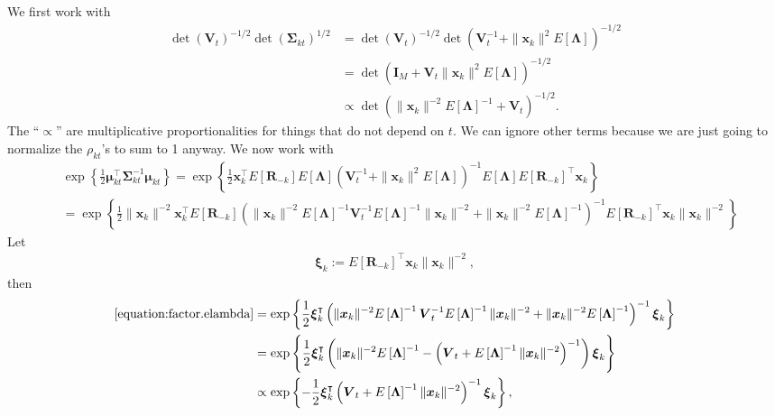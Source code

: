 \documentclass[11pt,authoryear]{article}
\newcommand{\bs}[1]{\boldsymbol{#1}}
\begin{document}
We first work with
\begin{align}
\det(\bs{V}_t)^{-1/2}\det(\bs{\Sigma}_{kt})^{1/2} &= \det(\bs{V}_t)^{-1/2}\det\left(\bs{V}_t^{-1} + \|\bs{x}_k\|^2E\left[\bs{\Lambda}\right]\right)^{-1/2}\\
&= \det\left(\bs{I}_M + \bs{V}_t\|\bs{x}_k\|^2E\left[\bs{\Lambda}\right]\right)^{-1/2}\\
\label{equation:y.marge.det}&\propto \det\left(\|\bs{x}_k\|^{-2}E\left[\bs{\Lambda}\right]^{-1} + \bs{V}_t\right)^{-1/2}.
\end{align}
The ``$\propto$'' are multiplicative proportionalities for things that
do not depend on $t$. We can ignore other terms because we are just
going to normalize the $\rho_{kt}$'s to sum to 1 anyway. We now work with
\begin{align}
&\exp\left\{\frac{1}{2}\bs{\mu}_{kt}^{\intercal}\bs{\Sigma}_{kt}^{-1}\bs{\mu}_{kt}\right\} = \exp\left\{\frac{1}{2}\bs{x}_k^{\intercal}E\left[\bs{R}_{-k}\right]E\left[\bs{\Lambda}\right]\left(\bs{V}_t^{-1} + \|\bs{x}_k\|^2E\left[\bs{\Lambda}\right]\right)^{-1}E\left[\bs{\Lambda}\right]E\left[\bs{R}_{-k}\right]^{\intercal}\bs{x}_k\right\}\\
\label{equation:factor.elambda}&=\exp\left\{\frac{1}{2}\|\bs{x}_k\|^{-2}\bs{x}_k^{\intercal}E\left[\bs{R}_{-k}\right]\left(\|\bs{x}_k\|^{-2}E\left[\bs{\Lambda}\right]^{-1}\bs{V}_t^{-1}E\left[\bs{\Lambda}\right]^{-1}\|\bs{x}_k\|^{-2} + \|\bs{x}_k\|^{-2}E\left[\bs{\Lambda}\right]^{-1}\right)^{-1}E\left[\bs{R}_{-k}\right]^{\intercal}\bs{x}_k\|\bs{x}_k\|^{-2}\right\}
\end{align}
Let
\begin{align}
\bs{\xi}_k := E\left[\bs{R}_{-k}\right]^{\intercal}\bs{x}_k\|\bs{x}_k\|^{-2},
\end{align}
then
\begin{align}
\eqref{equation:factor.elambda} &= \exp\left\{\frac{1}{2}\bs{\xi}_k^{\intercal}\left(\|\bs{x}_k\|^{-2}E\left[\bs{\Lambda}\right]^{-1}\bs{V}_t^{-1}E\left[\bs{\Lambda}\right]^{-1}\|\bs{x}_k\|^{-2} + \|\bs{x}_k\|^{-2}E\left[\bs{\Lambda}\right]^{-1}\right)^{-1}\bs{\xi}_k\right\}\\
\label{equation:woodbury}&= \exp\left\{\frac{1}{2}\bs{\xi}_k^{\intercal}\left(\|\bs{x}_k\|^{-2}E\left[\bs{\Lambda}\right]^{-1} - \left(\bs{V}_t + E\left[\bs{\Lambda}\right]^{-1}\|\bs{x}_k\|^{-2}\right)^{-1} \right)\bs{\xi}_k\right\}\\
\label{equation:y.marge.exp}&\propto \exp\left\{-\frac{1}{2}\bs{\xi}_k^{\intercal}\left(\bs{V}_t + E\left[\bs{\Lambda}\right]^{-1}\|\bs{x}_k\|^{-2}\right)^{-1}\bs{\xi}_k\right\},
\end{align}
\end{document}
